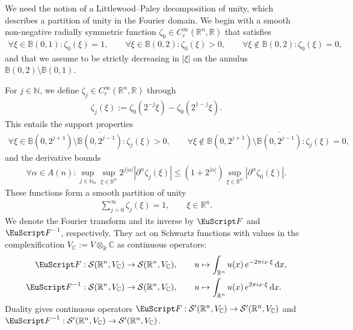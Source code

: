 \documentclass[10pt,a4paper]{amsart}
\theoremstyle{definition}
\theoremstyle{remark}
\numberwithin{equation}{section}
\newcommand{\bbB}{{\mathbb B}}
\newcommand{\bbC}{{\mathbb C}}
\newcommand{\bbN}{{\mathbb N}}
\newcommand{\bbR}{{\mathbb R}}
\newcommand{\calS}{{\mathcal S}}
\newcommand{\euF}{{\EuScript F}}
\newcommand{\closure}{\overline}
\newcommand{\Ball}[2]{\bbB(#1,#2)}
\newcommand{\dif}{{\mathrm d}}
\newcommand{\Fourier}{{\euF}}
\newcommand{\VEC}{{V}}
\begin{document}
We need the notion of a Littlewood--Paley decomposition of unity, which describes a partition of unity in the Fourier domain.
We begin with a smooth non-negative radially symmetric function $\zeta_{0} \in C^{\infty}_{c}(\bbR^{n},\bbR)$ that satisfies
\begin{gather*}
    \forall \xi \in \Ball{0}{1} : \zeta_{0}(\xi) = 1,
    \qquad
    \forall \xi \in \Ball{0}{2} : \zeta_{0}(\xi) > 0,
    \qquad
    \forall \xi \notin \Ball{0}{2} : \zeta_{0}(\xi) = 0,
\end{gather*}
and that we assume to be strictly decreasing in $|\xi|$ on the annulus $\Ball{0}{2} \setminus \Ball{0}{1}$.

For $j \in \bbN$, we define $\zeta_{j} \in C^{\infty}_{c}(\bbR^{n},\bbR)$ through
\begin{align*}
    \zeta_{j}(\xi) := \zeta_{0}( 2^{-j} \xi ) - \zeta_{0}( 2^{1-j} \xi )
    .
\end{align*}
This entails the support properties
\begin{gather*}
    \forall \xi \in \Ball{0}{2^{j+1}} \setminus \closure{\Ball{0}{2^{j-1}}} 
    : 
    \zeta_{j}(\xi) > 0,
    \qquad
    \forall \xi \notin \Ball{0}{2^{j+1}} \setminus \closure{\Ball{0}{2^{j-1}}} 
    : 
    \zeta_{j}(\xi) = 0,
\end{gather*}
and the derivative bounds 
\begin{align*}
    \forall \alpha \in A(n) 
    :
    \sup_{j \in \bbN_{0}} 
    \sup_{\xi \in \bbR^{n}} 
    2^{j|\alpha|}
    | \partial^{\alpha} \zeta_{j}(\xi) |
    \leq 
    ( 1 + 2^{|\alpha|} ) 
    \sup_{\xi \in \bbR^{n}} 
    | \partial^{\alpha} \zeta_{0}(\xi) |
    .
\end{align*}
These functions form a smooth partition of unity
\begin{align*}
    \sum_{j=0}^{\infty} \zeta_{j}(\xi) = 1, \qquad \xi \in \bbR^{n}
    .
\end{align*}
We denote the Fourier transform and its inverse by $\Fourier$ and $\Fourier^{-1}$, respectively.
They act on Schwartz functions with values in the complexification $\VEC_{\bbC} := \VEC \otimes_{\bbR} \bbC$ as continuous operators:
\begin{align*}
    \Fourier      &: \calS(\bbR^{n},\VEC_{\bbC}) \to \calS(\bbR^{n},\VEC_{\bbC}),
    \qquad 
    u \mapsto \int_{\bbR^{n}} u(x) \, e^{-2\pi i x \cdot \xi} \,\dif x,
    \\
    \Fourier^{-1} &: \calS(\bbR^{n},\VEC_{\bbC}) \to \calS(\bbR^{n},\VEC_{\bbC}),
    \qquad
    u \mapsto \int_{\bbR^{n}} u(x) \, e^{2\pi i x \cdot \xi} \,\dif x.
\end{align*}
Duality gives continuous operators $\Fourier : \calS'(\bbR^{n},\VEC_{\bbC}) \to \calS'(\bbR^{n},\VEC_{\bbC})$ and $\Fourier^{-1} : \calS'(\bbR^{n},\VEC_{\bbC}) \to \calS'(\bbR^{n},\VEC_{\bbC})$.
\end{document}
